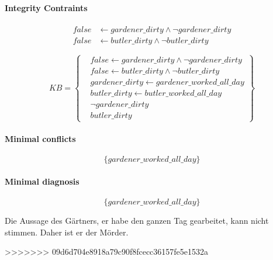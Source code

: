 \documentclass[DIV=9,numbers=noenddot]{scrartcl}
\begin{document}
	
	\paragraph{Integrity Contraints}
	\begin{align*}
		  false &\leftarrow gardener\_dirty \land \neg gardener\_dirty
		\\false &\leftarrow butler\_dirty \land \neg butler\_dirty
	\end{align*}
	
	\begin{equation}
		KB = \left\{
			\begin{aligned}
				&false \leftarrow gardener\_dirty \land \neg gardener\_dirty
				\\&false \leftarrow butler\_dirty \land \neg butler\_dirty
				\\&gardener\_dirty \leftarrow gardener\_worked\_all\_day
				\\&butler\_dirty \leftarrow butler\_worked\_all\_day
				\\&\neg gardener\_dirty
				\\&butler\_dirty
			\end{aligned}
		\right\}
	\end{equation}
	
	\paragraph{Minimal conflicts}
	\[\{gardener\_worked\_all\_day\}\]
	\paragraph{Minimal diagnosis}
	\[\{gardener\_worked\_all\_day\}\]

Die Aussage des Gärtners, er habe den ganzen Tag gearbeitet, kann nicht stimmen. Daher ist er der Mörder.
	
>>>>>>> 09d6d704e8918a79c90f8fcecc36157fe5e1532a
\end{document}
